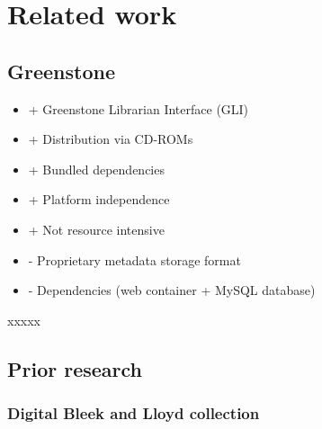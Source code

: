 \section{Related work}
\label{sec:background:related-work}

\subsection{Greenstone}
\label{sec:background:related-work:greenstone}

\begin{itemize}
 \item + Greenstone Librarian Interface (GLI)
 \item + Distribution via CD-ROMs
 \item + Bundled dependencies
 \item + Platform independence
 \item + Not resource intensive
 \item - Proprietary metadata storage format
 \item - Dependencies (web container + MySQL database)
\end{itemize}

xxxxx


\subsection{Prior research}
\label{sec:background:related-work:prior-research}
% 

\subsubsection{Digital Bleek and Lloyd collection}
\label{sec:background:related-work:prior-research:bleek-and-lloyd-collection}


